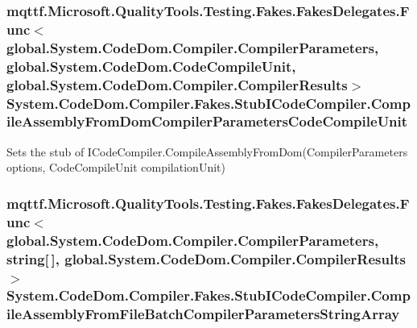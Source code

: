 \hypertarget{class_system_1_1_code_dom_1_1_compiler_1_1_fakes_1_1_stub_i_code_compiler_a57144a07c3b1f6bf61c03d7e68086f7f}{
\subsubsection[{Compile\-Assembly\-From\-Dom\-Compiler\-Parameters\-Code\-Compile\-Unit}]{\setlength{\rightskip}{0pt plus 5cm}mqttf.\-Microsoft.\-Quality\-Tools.\-Testing.\-Fakes.\-Fakes\-Delegates.\-Func$<$global.\-System.\-Code\-Dom.\-Compiler.\-Compiler\-Parameters, global.\-System.\-Code\-Dom.\-Code\-Compile\-Unit, global.\-System.\-Code\-Dom.\-Compiler.\-Compiler\-Results$>$ System.\-Code\-Dom.\-Compiler.\-Fakes.\-Stub\-I\-Code\-Compiler.\-Compile\-Assembly\-From\-Dom\-Compiler\-Parameters\-Code\-Compile\-Unit}}\label{class_system_1_1_code_dom_1_1_compiler_1_1_fakes_1_1_stub_i_code_compiler_a57144a07c3b1f6bf61c03d7e68086f7f}


Sets the stub of I\-Code\-Compiler.\-Compile\-Assembly\-From\-Dom(\-Compiler\-Parameters options, Code\-Compile\-Unit compilation\-Unit)

\hypertarget{class_system_1_1_code_dom_1_1_compiler_1_1_fakes_1_1_stub_i_code_compiler_ac44b5a4d9b6a142d9ff1768099825665}{
\subsubsection[{Compile\-Assembly\-From\-File\-Batch\-Compiler\-Parameters\-String\-Array}]{\setlength{\rightskip}{0pt plus 5cm}mqttf.\-Microsoft.\-Quality\-Tools.\-Testing.\-Fakes.\-Fakes\-Delegates.\-Func$<$global.\-System.\-Code\-Dom.\-Compiler.\-Compiler\-Parameters, string\mbox{[}$\,$\mbox{]}, global.\-System.\-Code\-Dom.\-Compiler.\-Compiler\-Results$>$ System.\-Code\-Dom.\-Compiler.\-Fakes.\-Stub\-I\-Code\-Compiler.\-Compile\-Assembly\-From\-File\-Batch\-Compiler\-Parameters\-String\-Array}}\label{class_system_1_1_code_dom_1_1_compiler_1_1_fakes_1_1_stub_i_code_compiler_ac44b5a4d9b6a142d9ff1768099825665}



